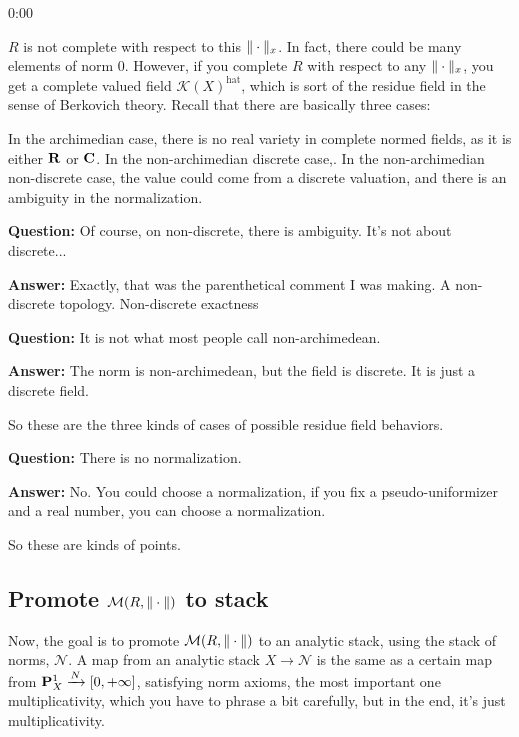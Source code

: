 \begin{unfinished}{0:00}
\begin{remark}
$R$ is not complete with respect to this $\norm{\cdot}_x$. In fact, there could be many elements of norm 0. However, if you complete $R$ with respect to any $\norm{\cdot}_x$, you get a complete valued field $\mathcal{K}(X)^{\text{hat}}$, which is sort of the residue field in the sense of Berkovich theory.
Recall that there are basically three cases:
\begin{enumerate}
\item archimedian $\iff$ $(\R, \norm{\cdot}^{\alpha})$ or $(\C, \norm{\cdot}^{\alpha)$, $\alpha \in [0, 1]$ by Ostrowski
\item non-archimedian but discrete, then you have the trivial norm $\norm{\cdot}_0 = \text{trivial norm}$
\item non-archimedian non-discrete, $\norm{\cdot}_{normalize}^{\alpha}, \alpha \in (0, \infty)$
\end{enumerate}
In the archimedian case, there is no real variety in complete normed fields, as it is either $\R$ or $\C$. In the non-archimedian discrete case,. In the non-archimedian non-discrete case, the value could come from a discrete valuation, and there is an ambiguity in the normalization.
\end{remark}

\textbf{Question:} Of course, on non-discrete, there is ambiguity. It's not about discrete... 

\textbf{Answer:} Exactly, that was the parenthetical comment I was making. A non-discrete topology. Non-discrete exactness 

\textbf{Question:} It is not what most people call non-archimedean. 

\textbf{Answer:} The norm is non-archimedean, but the field is discrete. It is just a discrete field.

So these are the three kinds of cases of possible residue field behaviors.

\textbf{Question:} There is no normalization.

\textbf{Answer:} No. You could choose a normalization, if you fix a pseudo-uniformizer and a real number, you can choose a normalization. 

So these are kinds of points.

\subsection{Promote $\BerkSpec(R, \norm{\cdot})$ to stack}
Now, the goal is to promote $\BerkSpec(R, \norm{\cdot})$ to an analytic stack, using the stack of norms, $\mathcal{N}$. A map from an analytic stack $X \to \mathcal{N}$ is the same as a certain map from $\P^1_X  \xrightarrow{N} [0, +\infty]$, satisfying norm axioms, the most important one multiplicativity, which you have to phrase a bit carefully, but in the end, it's just multiplicativity.


\end{unfinished}
